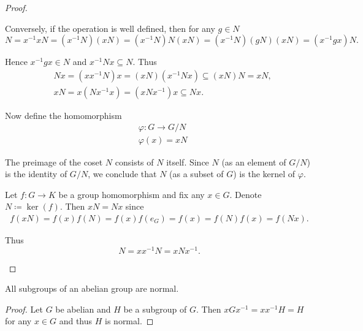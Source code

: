\begin{proof}
\begin{description}
    Conversely, if the operation is well defined, then for any \( g \in N \)
    \begin{equation*}
      N = x^{-1} x N = (x^{-1} N) (x N) = (x^{-1} N) N (x N) = (x^{-1} N) (g N) (x N) = (x^{-1} g x) N.
    \end{equation*}

    Hence \( x^{-1} g x \in N \) and \( x^{-1} N x \subseteq N \). Thus
    \begin{align*}
      &Nx = (x x^{-1} N)x = (xN) (x^{-1} N x) \subseteq (xN) N = xN,
      \\
      &xN = x(N x^{-1} x) = (x N x^{-1}) x \subseteq Nx.
    \end{align*}

    Now define the homomorphism
    \begin{align*}
      &\varphi: G \to G / N \\
      &\varphi(x) = xN
    \end{align*}

    The preimage of the coset \( N \) consists of \( N \) itself. Since \( N \) (as an element of \( G / N \)) is the identity of \( G / N \), we conclude that \( N \) (as a subset of \( G \)) is the kernel of \( \varphi \).

     Let \( f: G \to K \) be a group homomorphism and fix any \( x \in G \). Denote \( N \coloneqq \ker(f) \). Then \( xN = Nx \) since
    \begin{align*}
      f(xN)
      =
      f(x) f(N)
      =
      f(x) f(e_G)
      =
      f(x)
      =
      f(N) f(x)
      =
      f(Nx).
    \end{align*}

    Thus
    \begin{equation*}
      N = xx^{-1}N = xNx^{-1}.
    \end{equation*}
  \end{description}
\end{proof}

\begin{proposition}\label{thm:abelian_normal_subgroups}
  All subgroups of an abelian group are normal.
\end{proposition}
\begin{proof}
  Let \( G \) be abelian and \( H \) be a subgroup of \( G \). Then \( xGx^{-1} = xx^{-1}H = H \) for any \( x \in G \) and thus \( H \) is normal.
\end{proof}

